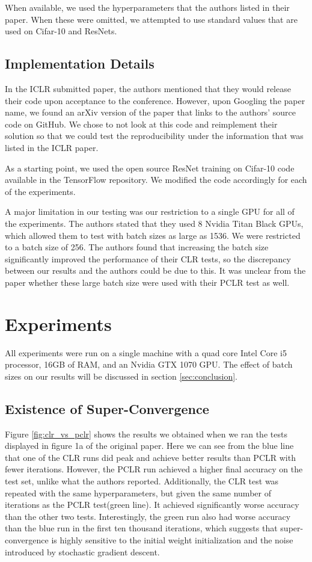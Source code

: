 \documentclass[10pt,twocolumn,letterpaper]{article}
\begin{document}
When available, we used the hyperparameters that the authors listed in their
paper. When these were omitted, we attempted to use standard values that are
used on Cifar-10 and ResNets.

\subsection{Implementation Details}
In the ICLR submitted paper, the authors mentioned that they would release
their code upon acceptance to the conference. However, upon Googling the paper
name, we found an arXiv version of the paper that links to the authors' source
code on GitHub. We chose to not look at this code and reimplement their
solution so that we could test the reproducibility under the information
that was listed in the ICLR paper.

As a starting point, we used the open source ResNet training on Cifar-10 code
available in the TensorFlow \cite{TensorFlow} repository. We modified the code
accordingly for each of the experiments.

A major limitation in our testing was our restriction to a single GPU for all
of the experiments. The authors stated that they used 8 Nvidia Titan Black
GPUs, which allowed them to test with batch sizes as large as 1536. We were
restricted to a batch size of 256. The authors found that increasing the batch
size significantly improved the performance of their CLR tests, so the
discrepancy between our results and the authors could be due to this. It was
unclear from the paper whether these large batch size were used with their PCLR
test as well.


\section{Experiments}
All experiments were run on a single machine with a quad core Intel Core i5
processor, 16GB of RAM, and an Nvidia GTX 1070 GPU. The effect of batch sizes
on our results will be discussed in section \ref{sec:conclusion}.

\subsection{Existence of Super-Convergence}
\label{sec:existence_of_super_convergence}
Figure \ref{fig:clr_vs_pclr} shows the results we obtained when we ran the
tests displayed in figure 1a of the original paper. Here we can see from the
blue line that one of the CLR runs did peak and achieve better results than
PCLR with fewer iterations. However, the PCLR run achieved a higher final
accuracy on the test set, unlike what the authors reported. Additionally, the
CLR test was repeated with the same hyperparameters, but given the same number
of iterations as the PCLR test(green line). It achieved significantly worse
accuracy than the other two tests. Interestingly, the green run also had worse
accuracy than the blue run in the first ten thousand iterations, which suggests
that super-convergence is highly sensitive to the initial weight initialization
and the noise introduced by stochastic gradient descent.
\end{document}
